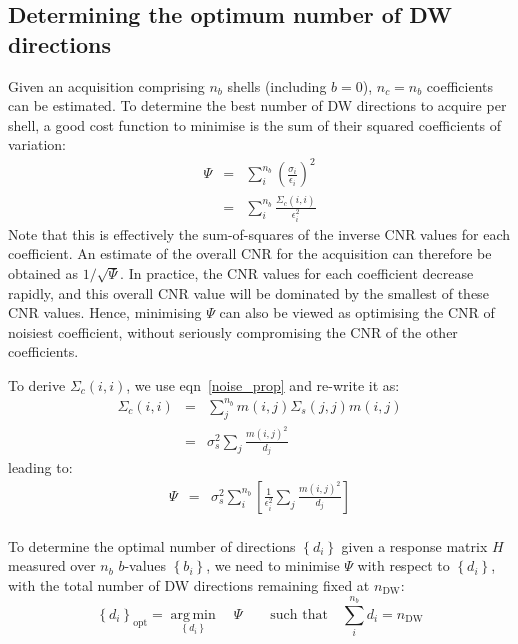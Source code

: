 \documentclass{article}
\newcommand{\nDW}{n_{\textrm{DW}}}
\DeclareMathOperator*{\argmin}{arg\,min}
\begin{document}
\subsection{Determining the optimum number of DW directions}

Given an acquisition comprising $n_b$ shells (including $b=0$), $n_c = n_b$ 
coefficients can be estimated. To determine the best number of DW directions to
acquire per shell, a good cost function to minimise is the sum of their
squared coefficients of variation:
\begin{eqnarray}
\label{efficiency}
\Psi & = & \sum_i^{n_b} \left( \frac{\sigma_i}{\epsilon_i} \right)^2 \\
& = & \sum_i^{n_b} \frac{\Sigma_c(i,i)}{\epsilon_i^2}
\end{eqnarray}
Note that this is effectively the sum-of-squares of the inverse CNR values for
each coefficient. An estimate of the overall CNR for the acquisition can
therefore be obtained as $1/\sqrt{\Psi}$. In practice, the CNR values for each
coefficient decrease rapidly, and this overall CNR value will be dominated by
the smallest of these CNR values. Hence, minimising $\Psi$ can also be viewed
as optimising the CNR of noisiest coefficient, without seriously compromising the
CNR of the other coefficients.

To derive $\Sigma_c(i,i)$, we use eqn~\ref{noise_prop} and re-write it as:
\begin{eqnarray}
\Sigma_c(i,i) & = & \sum_j^{n_b} m(i,j) \Sigma_s(j,j) m(i,j) \\
& = & \sigma_s^2 \sum_j \frac{ m(i,j)^2 }{ d_j }
\end{eqnarray}
leading to:
\begin{eqnarray}
\Psi & = & \sigma_s^2 \sum_i^{n_b} \left[ \frac{1}{\epsilon_i^2} \sum_j \frac{ m(i,j)^2 }{ d_j } \right] \\
\end{eqnarray}

To determine the optimal number of directions $\left\{ d_i \right\}$ given a
response matrix $H$ measured over $n_b$ $b$-values $\left\{ b_i \right\}$, we
need to minimise $\Psi$ with respect to $\left\{ d_i \right\}$, with the total
number of DW directions remaining fixed at $\nDW$:
\begin{equation}
\left\{ d_i \right\}_{\textrm{opt}} = \underset{ \left\{ d_i \right\} }{\argmin} \quad \Psi 
\qquad \textrm{such that} \quad \sum_i^{n_b} d_i = \nDW
\end{equation}
\end{document}
